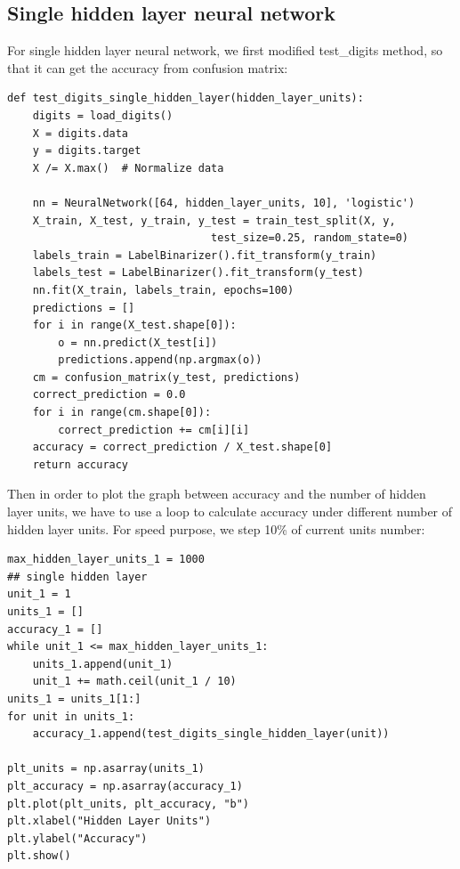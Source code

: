 \documentclass{article}
\begin{document}
\subsection{Single hidden layer neural network}
For single hidden layer neural network, we first modified test\_digits method, so that it can get the accuracy from confusion matrix:
\begin{lstlisting}
def test_digits_single_hidden_layer(hidden_layer_units):
	digits = load_digits()
	X = digits.data
	y = digits.target
	X /= X.max()  # Normalize data
	
	nn = NeuralNetwork([64, hidden_layer_units, 10], 'logistic')
	X_train, X_test, y_train, y_test = train_test_split(X, y, 
								test_size=0.25, random_state=0)
	labels_train = LabelBinarizer().fit_transform(y_train)
	labels_test = LabelBinarizer().fit_transform(y_test)
	nn.fit(X_train, labels_train, epochs=100)
	predictions = []
	for i in range(X_test.shape[0]):
		o = nn.predict(X_test[i])
		predictions.append(np.argmax(o))
	cm = confusion_matrix(y_test, predictions)
	correct_prediction = 0.0
	for i in range(cm.shape[0]):
		correct_prediction += cm[i][i]
	accuracy = correct_prediction / X_test.shape[0]
	return accuracy
\end{lstlisting}

Then in order to plot the graph between accuracy and the number of hidden layer units, we have to use a loop to calculate accuracy under different number of hidden layer units. For speed purpose, we step 10\% of current units number:
\begin{lstlisting}
max_hidden_layer_units_1 = 1000
## single hidden layer
unit_1 = 1
units_1 = []
accuracy_1 = []
while unit_1 <= max_hidden_layer_units_1:
	units_1.append(unit_1)
	unit_1 += math.ceil(unit_1 / 10)
units_1 = units_1[1:]
for unit in units_1:
	accuracy_1.append(test_digits_single_hidden_layer(unit))

plt_units = np.asarray(units_1)
plt_accuracy = np.asarray(accuracy_1)
plt.plot(plt_units, plt_accuracy, "b")
plt.xlabel("Hidden Layer Units")
plt.ylabel("Accuracy")
plt.show()
\end{lstlisting}
\end{document}
